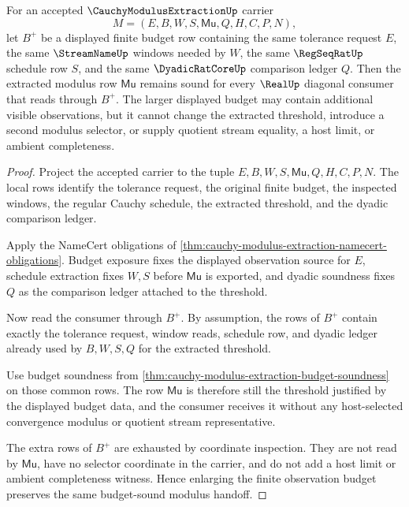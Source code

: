 \begin{theorem}
\label{thm:cauchy-modulus-extraction-budget-monotonicity}
For an accepted $\CauchyModulusExtractionUp$ carrier
$$
M=(E,B,W,S,\mathsf{Mu},Q,H,C,P,N),
$$
let $B^{+}$ be a displayed finite budget row containing the same tolerance request $E$, the same $\StreamNameUp$ windows needed by $W$, the same $\RegSeqRatUp$ schedule row $S$, and the same $\DyadicRatCoreUp$ comparison ledger $Q$. Then the extracted modulus row $\mathsf{Mu}$ remains sound for every $\RealUp$ diagonal consumer that reads through $B^{+}$. The larger displayed budget may contain additional visible observations, but it cannot change the extracted threshold, introduce a second modulus selector, or supply quotient stream equality, a host limit, or ambient completeness.
\end{theorem}
\begin{proof}
Project the accepted carrier to the tuple $E,B,W,S,\mathsf{Mu},Q,H,C,P,N$. The local rows identify the tolerance request, the original finite budget, the inspected windows, the regular Cauchy schedule, the extracted threshold, and the dyadic comparison ledger.

Apply the NameCert obligations of \autoref{thm:cauchy-modulus-extraction-namecert-obligations}. Budget exposure fixes the displayed observation source for $E$, schedule extraction fixes $W,S$ before $\mathsf{Mu}$ is exported, and dyadic soundness fixes $Q$ as the comparison ledger attached to the threshold.

Now read the consumer through $B^{+}$. By assumption, the rows of $B^{+}$ contain exactly the tolerance request, window reads, schedule row, and dyadic ledger already used by $B,W,S,Q$ for the extracted threshold.

Use budget soundness from \autoref{thm:cauchy-modulus-extraction-budget-soundness} on those common rows. The row $\mathsf{Mu}$ is therefore still the threshold justified by the displayed budget data, and the consumer receives it without any host-selected convergence modulus or quotient stream representative.

The extra rows of $B^{+}$ are exhausted by coordinate inspection. They are not read by $\mathsf{Mu}$, have no selector coordinate in the carrier, and do not add a host limit or ambient completeness witness. Hence enlarging the finite observation budget preserves the same budget-sound modulus handoff.
\end{proof}

